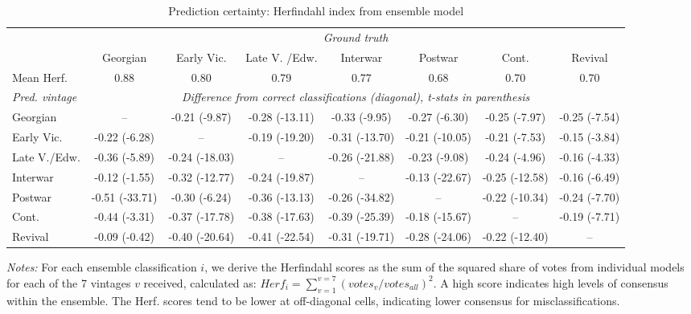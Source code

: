\documentclass[]{article}
\begin{document}
\begin{table}[!htb] 
\caption{Prediction certainty: Herfindahl index from ensemble model} 
\label{tab:herftab} 
\footnotesize
\begin{tabular}{lccccccc}
\toprule 
  & \multicolumn{7}{c}{\emph{Ground truth}} \\ 
  \cmidrule(lr){2-8} 
& Georgian &  Early Vic. & Late V. /Edw. & Interwar & Postwar & Cont. & Revival \\  

Mean Herf. & 0.88 &  0.80 & 0.79 & 0.77 & 0.68 &  0.70 &  0.70 \\  
 \midrule 
\emph{Pred. vintage} & \multicolumn{7}{c}{\emph{Difference from correct classifications (diagonal), t-stats in parenthesis}} \\
\cmidrule(lr){2-8} 
Georgian & -- & -0.21 (-9.87) & -0.28 (-13.11) & -0.33 (-9.95) & -0.27 (-6.30) & -0.25 (-7.97) & -0.25 (-7.54) \\
 Early Vic. & -0.22 (-6.28) &  -- & -0.19 (-19.20) & -0.31 (-13.70) & -0.21 (-10.05) & -0.21 (-7.53) & -0.15 (-3.84) \\
 Late V./Edw. & -0.36 (-5.89) & -0.24 (-18.03) &  -- & -0.26 (-21.88) & -0.23 (-9.08) & -0.24 (-4.96) & -0.16 (-4.33) \\
 Interwar & -0.12 (-1.55) & -0.32 (-12.77) & -0.24 (-19.87) &  -- & -0.13 (-22.67) & -0.25 (-12.58) & -0.16 (-6.49) \\
 Postwar & -0.51 (-33.71) & -0.30 (-6.24) & -0.36 (-13.13) & -0.26 (-34.82) & -- & -0.22 (-10.34) & -0.24 (-7.70) \\
 Cont. & -0.44 (-3.31) & -0.37 (-17.78) & -0.38 (-17.63) & -0.39 (-25.39) & -0.18 (-15.67) & -- & -0.19 (-7.71) \\
 Revival & -0.09 (-0.42) & -0.40 (-20.64) & -0.41 (-22.54) & -0.31 (-19.71) & -0.28 (-24.06) & -0.22 (-12.40) &  -- \\
\bottomrule 
\end{tabular}
\begin{minipage}{\textwidth}
\vspace{0.25cm}
\footnotesize \emph{Notes:} For each ensemble classification $i$, we derive the Herfindahl scores as the sum of the squared share of votes from individual models for each of the 7 vintages $v$ received, calculated as: $Herf_i=\sum_{v=1}^{v=7} (votes_v/votes_{all})^2$. A high score indicates high levels of consensus within the ensemble. The Herf. scores tend to be lower at off-diagonal cells, indicating lower consensus for misclassifications.
\end{minipage}
\end{table}
\end{document}
